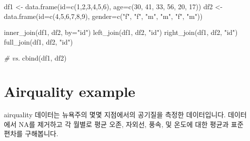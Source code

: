 \documentclass[
]{book}
\newenvironment{Shaded}{\begin{snugshade}}{\end{snugshade}}
\newcommand{\AttributeTok}[1]{\textcolor[rgb]{0.77,0.63,0.00}{#1}}
\newcommand{\CommentTok}[1]{\textcolor[rgb]{0.56,0.35,0.01}{\textit{#1}}}
\newcommand{\DecValTok}[1]{\textcolor[rgb]{0.00,0.00,0.81}{#1}}
\newcommand{\FunctionTok}[1]{\textcolor[rgb]{0.00,0.00,0.00}{#1}}
\newcommand{\NormalTok}[1]{#1}
\newcommand{\OtherTok}[1]{\textcolor[rgb]{0.56,0.35,0.01}{#1}}
\newcommand{\StringTok}[1]{\textcolor[rgb]{0.31,0.60,0.02}{#1}}
\begin{document}
\begin{Shaded}
\begin{Highlighting}[]
\NormalTok{df1 }\OtherTok{\textless{}{-}} \FunctionTok{data.frame}\NormalTok{(}\AttributeTok{id=}\FunctionTok{c}\NormalTok{(}\DecValTok{1}\NormalTok{,}\DecValTok{2}\NormalTok{,}\DecValTok{3}\NormalTok{,}\DecValTok{4}\NormalTok{,}\DecValTok{5}\NormalTok{,}\DecValTok{6}\NormalTok{), }\AttributeTok{age=}\FunctionTok{c}\NormalTok{(}\DecValTok{30}\NormalTok{, }\DecValTok{41}\NormalTok{, }\DecValTok{33}\NormalTok{, }\DecValTok{56}\NormalTok{, }\DecValTok{20}\NormalTok{, }\DecValTok{17}\NormalTok{))}
\NormalTok{df2 }\OtherTok{\textless{}{-}} \FunctionTok{data.frame}\NormalTok{(}\AttributeTok{id=}\FunctionTok{c}\NormalTok{(}\DecValTok{4}\NormalTok{,}\DecValTok{5}\NormalTok{,}\DecValTok{6}\NormalTok{,}\DecValTok{7}\NormalTok{,}\DecValTok{8}\NormalTok{,}\DecValTok{9}\NormalTok{), }\AttributeTok{gender=}\FunctionTok{c}\NormalTok{(}\StringTok{"f"}\NormalTok{, }\StringTok{"f"}\NormalTok{, }\StringTok{"m"}\NormalTok{, }\StringTok{"m"}\NormalTok{, }\StringTok{"f"}\NormalTok{, }\StringTok{"m"}\NormalTok{))}

\FunctionTok{inner\_join}\NormalTok{(df1, df2, }\AttributeTok{by=}\StringTok{"id"}\NormalTok{)}
\FunctionTok{left\_join}\NormalTok{(df1, df2, }\StringTok{"id"}\NormalTok{)}
\FunctionTok{right\_join}\NormalTok{(df1, df2, }\StringTok{"id"}\NormalTok{)}
\FunctionTok{full\_join}\NormalTok{(df1, df2, }\StringTok{"id"}\NormalTok{)}

\CommentTok{\# vs.}
\FunctionTok{cbind}\NormalTok{(df1, df2)}
\end{Highlighting}
\end{Shaded}

\hypertarget{airquality-example}{%
\section{Airquality example}\label{airquality-example}}

airquality 데이터는 뉴욕주의 몇몇 지점에서의 공기질을 측정한 데이터입니다. 데이터에서 NA를 제거하고 각 월별로 평균 오존, 자외선, 풍속, 및 온도에 대한 평균과 표준편차를 구해봅니다.
\end{document}
